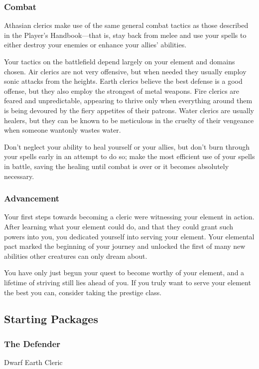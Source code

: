 \subsubsection{Combat}
Athasian clerics make use of the same general combat tactics as those described in the Player's Handbook---that is, stay back from melee and use your spells to either destroy your enemies or enhance your allies' abilities.

Your tactics on the battlefield depend largely on your element and domains chosen. Air clerics are not very offensive, but when needed they usually employ sonic attacks from the heights. Earth clerics believe the best defense is a good offense, but they also employ the strongest of metal weapons. Fire clerics are feared and unpredictable, appearing to thrive only when everything around them is being devoured by the fiery appetites of their patrons. Water clerics are usually healers, but they can be known to be meticulous in the cruelty of their vengeance when someone wantonly wastes water.

Don't neglect your ability to heal yourself or your allies, but don't burn through your spells early in an attempt to do so; make the most efficient use of your spells in battle, saving the healing until combat is over or it becomes absolutely necessary.

\subsubsection{Advancement}
Your first steps towards becoming a cleric were witnessing your element in action. After learning what your element could do, and that they could grant such powers into you, you dedicated yourself into serving your element. Your elemental pact marked the beginning of your journey and unlocked the first of many new abilities other creatures can only dream about.

You have only just begun your quest to become worthy of your element, and a lifetime of striving still lies ahead of you. If you truly want to serve your element the best you can, consider taking the  prestige class.


\subsection{Starting Packages}
\subsubsection{The Defender}
Dwarf Earth Cleric

